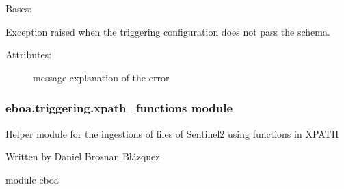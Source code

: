 
\begin{fulllineitems}
\label{\detokenize{eboa.triggering:eboa.triggering.errors.TriggeringConfigDoesNotPassSchema}}
Bases: {\hyperref[\detokenize{eboa.triggering:eboa.triggering.errors.Error}]{}}

Exception raised when the triggering configuration does not pass the schema.
\begin{description}
\item[{Attributes:}] \leavevmode
message \textendash{} explanation of the error

\end{description}

\end{fulllineitems}



\subsubsection{eboa.triggering.xpath\_functions module}
\label{\detokenize{eboa.triggering:module-eboa.triggering.xpath_functions}}\label{\detokenize{eboa.triggering:eboa-triggering-xpath-functions-module}}
Helper module for the ingestions of files of Sentinel\sphinxhyphen{}2 using functions in XPATH

Written by Daniel Brosnan Blázquez

module eboa

